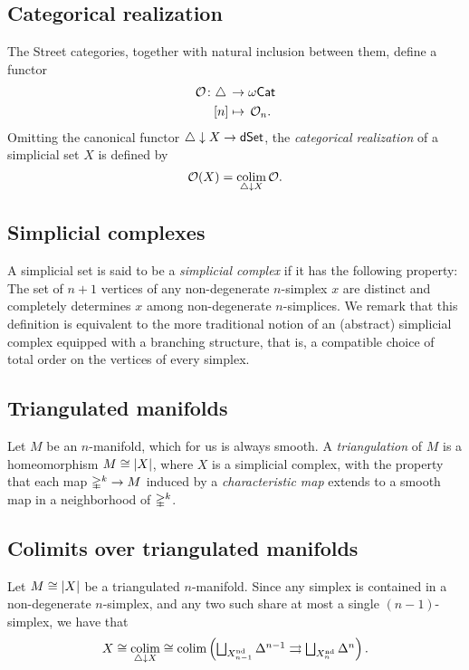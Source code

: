 \subsection{Categorical realization}

The Street categories, together with natural inclusion between them, define a functor
\[
\begin{split}
	\mathcal{O} \colon \triangle \, &\to \omega\mathsf{Cat} \\
	[n] &\mapsto \, \mathcal{O}_n.
\end{split}
\]
Omitting the canonical functor $\triangle \downarrow X \to \mathsf{dSet}$, the \textit{categorical realization} of a simplicial set $X$ is defined by
\[
\mathcal{O}(X) = \operatorname*{colim}_{\triangle \downarrow X} \mathcal{O}.
\]

\subsection{Simplicial complexes}

A simplicial set is said to be a \textit{simplicial complex} if it has the following property: The set of $n+1$ vertices of any non-degenerate $n$-simplex $x$ are distinct and completely determines $x$ among non-degenerate $n$-simplices.
We remark that this definition is equivalent to the more traditional notion of an (abstract) simplicial complex equipped with a branching structure, that is, a compatible choice of total order on the vertices of every simplex.

\subsection{Triangulated manifolds}

Let $M$ be an $n$-manifold, which for us is always smooth.
A \textit{triangulation} of $M$ is a homeomorphism $M \cong \lvert X\rvert$, where $X$ is a simplicial complex, with the property that each map $\mathbb{\Delta}^k \to M$ induced by a \textit{characteristic map} extends to a smooth map in a neighborhood of $\mathbb{\Delta}^k$.

\subsection{Colimits over triangulated manifolds}

Let $M \cong \lvert X\rvert$ be a triangulated $n$-manifold.
Since any simplex is contained in a non-degenerate $n$-simplex, and any two such share at most a single $(n-1)$-simplex, we have that
\[
X \cong \operatorname*{colim}_{\triangle \downarrow X}
  \cong \textstyle \operatorname*{colim} \left(\bigsqcup_{X_{n-1}^{\mathrm{nd}}} \Delta^{n-1} \rightrightarrows \bigsqcup_{X_n^{\mathrm{nd}}} \Delta^n \right).
\]


